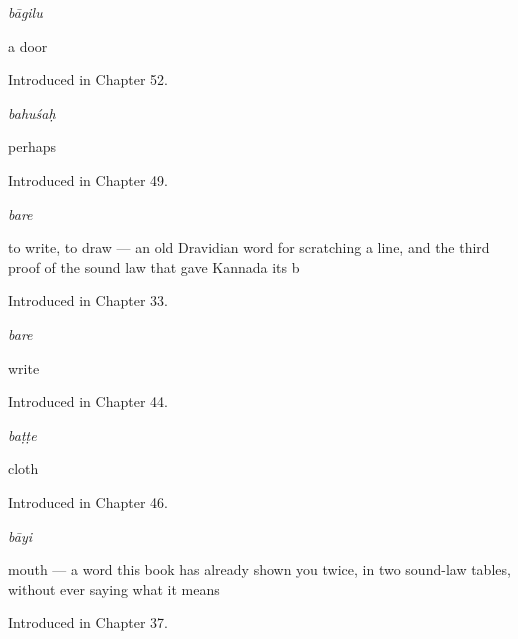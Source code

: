 \noindent\begin{minipage}[t]{\linewidth}
\raggedright
\textbf{}\enspace\emph{bāgilu}\par
\small a door\par
\footnotesize Introduced in Chapter 52.
\end{minipage}\par\medskip

\noindent\begin{minipage}[t]{\linewidth}
\raggedright
\textbf{}\enspace\emph{bahuśaḥ}\par
\small perhaps\par
\footnotesize Introduced in Chapter 49.
\end{minipage}\par\medskip

\noindent\begin{minipage}[t]{\linewidth}
\raggedright
\textbf{}\enspace\emph{bare}\par
\small to write, to draw — an old Dravidian word for scratching a line, and the third proof of the sound law that gave Kannada its b\par
\footnotesize Introduced in Chapter 33.
\end{minipage}\par\medskip

\noindent\begin{minipage}[t]{\linewidth}
\raggedright
\textbf{}\enspace\emph{bare}\par
\small write\par
\footnotesize Introduced in Chapter 44.
\end{minipage}\par\medskip

\noindent\begin{minipage}[t]{\linewidth}
\raggedright
\textbf{}\enspace\emph{baṭṭe}\par
\small cloth\par
\footnotesize Introduced in Chapter 46.
\end{minipage}\par\medskip

\noindent\begin{minipage}[t]{\linewidth}
\raggedright
\textbf{}\enspace\emph{bāyi}\par
\small mouth — a word this book has already shown you twice, in two sound-law tables, without ever saying what it means\par
\footnotesize Introduced in Chapter 37.
\end{minipage}\par\medskip

